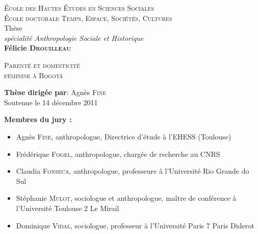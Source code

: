\thispagestyle{empty} 
\singlespacing

\bigskip{}

\begin{center}
  \Large \textsc{École des Hautes Études en Sciences Sociales}\\
  \large \textsc{École doctorale Temps, Espace, Sociétés, Cultures}\\
  \vspace{2ex}
  \large \noindent Thèse\\
  \emph{spécialité Anthropologie Sociale et Historique}\\
  \vspace{1cm}
  {\large \textbf{Félicie \textsc{Drouilleau}}}
\end{center}
\normalsize
\begin{center}
\begin{huge} 
  \vspace{1cm}
  \textsc{Parenté et domesticité \\
    féminine à Bogotá}\\
  \vspace{1cm}
\end{huge} 
\end{center}

\vspace{1cm}

\begin{center}
  \large{} \textbf{Thèse dirigée par}: Agnès \textsc{Fine}\\
  \vspace{1ex}
  Soutenue le 14 décembre 2011
\end{center}
\vspace{1cm}

\begin{flushleft}
 \normalsize
 \textbf{Membres du jury : }
 \vspace{1ex}
    \begin{itemize}
    \item Agnès \textsc{Fine}, anthropologue, Directrice d'étude à
      l'EHESS (Toulouse)
    \item Frédérique \textsc{Fogel}, anthropologue, chargée de recherche au CNRS
    \item Claudia \textsc{Fonseca}, anthropologue, professeure à
      l'Université Rio Grande do Sul
    \item Stéphanie \textsc{Mulot}, sociologue et anthropologue,
      maître de conférence à l'Université Toulouse 2 Le Mirail
    \item Dominique \textsc{Vidal}, sociologue, professeur à
      l'Université Paris 7 Paris Diderot
    \end{itemize} 
\end{flushleft}

